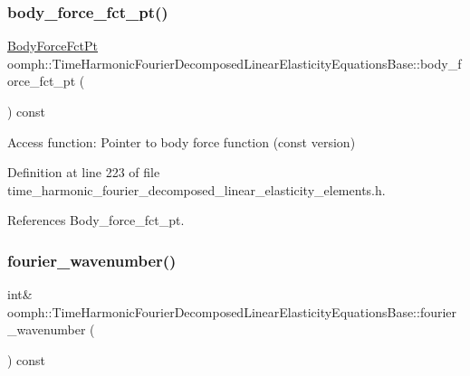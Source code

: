 \subsubsection{\texorpdfstring{body\+\_\+force\+\_\+fct\+\_\+pt()}{body\_force\_fct\_pt()}\hspace{0.1cm}{\footnotesize\ttfamily [2/2]}}
{\footnotesize\ttfamily \hyperlink{classoomph_1_1TimeHarmonicFourierDecomposedLinearElasticityEquationsBase_ac582edc989cd98af8a03f5bf58d7a05a}{Body\+Force\+Fct\+Pt} oomph\+::\+Time\+Harmonic\+Fourier\+Decomposed\+Linear\+Elasticity\+Equations\+Base\+::body\+\_\+force\+\_\+fct\+\_\+pt (\begin{DoxyParamCaption}{ }\end{DoxyParamCaption}) const\hspace{0.3cm}{\ttfamily [inline]}}



Access function\+: Pointer to body force function (const version) 



Definition at line 223 of file time\+\_\+harmonic\+\_\+fourier\+\_\+decomposed\+\_\+linear\+\_\+elasticity\+\_\+elements.\+h.



References Body\+\_\+force\+\_\+fct\+\_\+pt.

\mbox{\label{classoomph_1_1TimeHarmonicFourierDecomposedLinearElasticityEquationsBase_a51a6f8b0d27880252518256dbe60bc49}} 
\subsubsection{\texorpdfstring{fourier\+\_\+wavenumber()}{fourier\_wavenumber()}}
{\footnotesize\ttfamily int\& oomph\+::\+Time\+Harmonic\+Fourier\+Decomposed\+Linear\+Elasticity\+Equations\+Base\+::fourier\+\_\+wavenumber (\begin{DoxyParamCaption}{ }\end{DoxyParamCaption}) const\hspace{0.3cm}{\ttfamily [inline]}}



